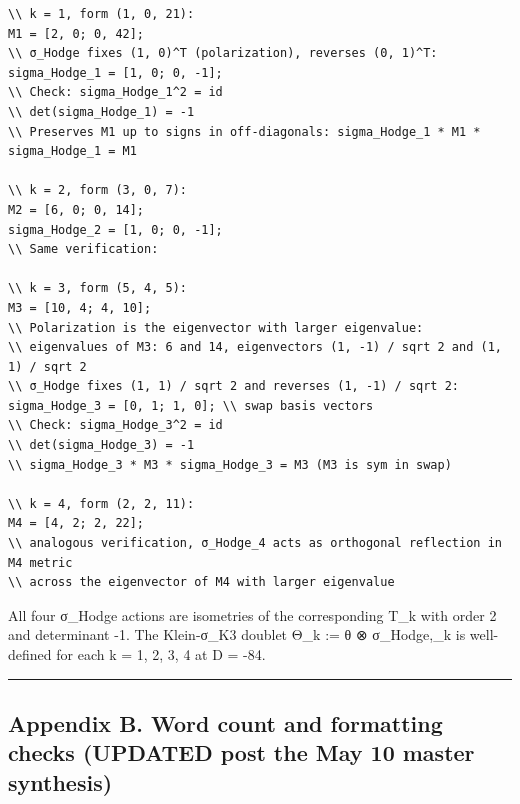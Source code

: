 \documentclass[
 11pt,
 a4paper,
]{article}
\begin{document}
\begin{verbatim}
\\ k = 1, form (1, 0, 21):
M1 = [2, 0; 0, 42];
\\ σ_Hodge fixes (1, 0)^T (polarization), reverses (0, 1)^T:
sigma_Hodge_1 = [1, 0; 0, -1];
\\ Check: sigma_Hodge_1^2 = id 
\\ det(sigma_Hodge_1) = -1 
\\ Preserves M1 up to signs in off-diagonals: sigma_Hodge_1 * M1 * sigma_Hodge_1 = M1 

\\ k = 2, form (3, 0, 7):
M2 = [6, 0; 0, 14];
sigma_Hodge_2 = [1, 0; 0, -1];
\\ Same verification: 

\\ k = 3, form (5, 4, 5):
M3 = [10, 4; 4, 10];
\\ Polarization is the eigenvector with larger eigenvalue:
\\ eigenvalues of M3: 6 and 14, eigenvectors (1, -1) / sqrt 2 and (1, 1) / sqrt 2
\\ σ_Hodge fixes (1, 1) / sqrt 2 and reverses (1, -1) / sqrt 2:
sigma_Hodge_3 = [0, 1; 1, 0]; \\ swap basis vectors
\\ Check: sigma_Hodge_3^2 = id 
\\ det(sigma_Hodge_3) = -1 
\\ sigma_Hodge_3 * M3 * sigma_Hodge_3 = M3 (M3 is sym in swap)

\\ k = 4, form (2, 2, 11):
M4 = [4, 2; 2, 22];
\\ analogous verification, σ_Hodge_4 acts as orthogonal reflection in M4 metric
\\ across the eigenvector of M4 with larger eigenvalue
\end{verbatim}

All four σ\_Hodge actions are isometries of the corresponding T\_k with order 2 and determinant -1. The Klein-σ\_K3 doublet Θ\_k := θ ⊗ σ\_Hodge,\_k is well-defined for each k = 1, 2, 3, 4 at D = -84.

\begin{center}\rule{0.5\linewidth}{0.5pt}\end{center}

\hypertarget{appendix-b.-word-count-and-formatting-checks-updated-post-the May 10 master synthesis}{%
\subsection{Appendix B. Word count and formatting checks (UPDATED post the May 10 master synthesis)}\label{appendix-b.-word-count-and-formatting-checks-updated-post-the May 10 master synthesis}}
\end{document}
